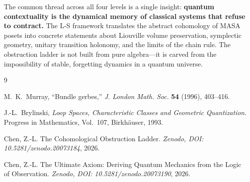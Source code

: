 \documentclass[11pt]{article}
\begin{document}
The common thread across all four levels is a single insight:
\textbf{quantum contextuality is the dynamical memory of classical
systems that refuse to contract.} The L-S framework translates the
abstract cohomology of MASA posets into concrete statements about
Liouville volume preservation, symplectic geometry, unitary transition
holonomy, and the limits of the chain rule. The obstruction ladder is
not built from pure algebra---it is carved from the impossibility of
stable, forgetting dynamics in a quantum universe.

\begin{thebibliography}{9}

M.~K.~Murray,
``Bundle gerbes,''
\textit{J. London Math. Soc.} \textbf{54} (1996), 403--416.

J.-L.~Brylinski,
\textit{Loop Spaces, Characteristic Classes and Geometric Quantization}.
Progress in Mathematics, Vol.~107, Birkh\"auser, 1993.

Chen, Z.-L.
The Cohomological Obstruction Ladder.
\textit{Zenodo, DOI: 10.5281/zenodo.20073184}, 2026.

Chen, Z.-L.
The Ultimate Axiom: Deriving Quantum Mechanics from the Logic of
Observation.
\textit{Zenodo, DOI: 10.5281/zenodo.20073190}, 2026.

\end{thebibliography}
\end{document}
